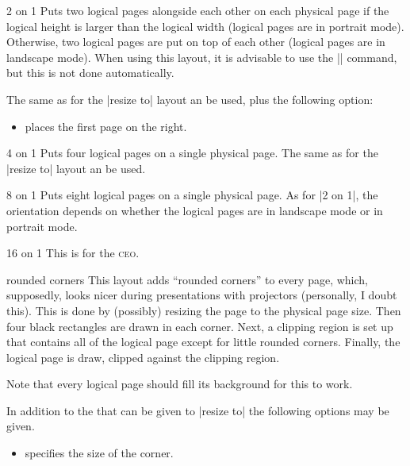 \begin{pgflayout}{2 on 1}
  Puts two logical pages alongside each other on each physical page if
  the logical height is larger than the logical width (logical pages
  are in portrait mode). Otherwise, two
  logical pages are put on top of each other (logical pages are in
  landscape mode). When using this layout, it is advisable to use the
  |\nofiles| command, but this is not done automatically.

  The same  as for the |resize to| layout an be used,
  plus the following option:
  \begin{itemize}
  \item
    places the first page on the right.
  \end{itemize}
\end{pgflayout}


\begin{pgflayout}{4 on 1}
  Puts four logical pages on a single physical page.
  The same  as for the |resize to| layout an be used.
\end{pgflayout}

\begin{pgflayout}{8 on 1}
  Puts eight logical pages on a single physical page. As for |2 on 1|,
  the orientation depends on whether the logical pages are in
  landscape mode or in portrait mode.
\end{pgflayout}

\begin{pgflayout}{16 on 1}
  This is for the \textsc{ceo}.
\end{pgflayout}

\begin{pgflayout}{rounded corners}
  \label{layout-rounded-corners}
  This layout adds ``rounded corners'' to every page, which,
  supposedly, looks nicer during presentations with projectors
  (personally, I doubt this). This is done by (possibly) resizing the
  page to the physical page size. Then four black rectangles are
  drawn in each corner. Next, a clipping region is set up that
  contains all of the logical page except for little rounded
  corners. Finally, the logical page is draw, clipped against the
  clipping region.

  Note that every logical page should fill its background for this to
  work.

  In addition to the  that can be given to |resize to|
  the following options may be given.
  \begin{itemize}
    \item {} specifies the size of
    the corner.
  \end{itemize}

\end{pgflayout}

